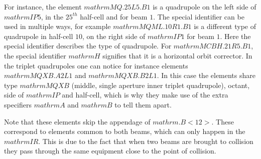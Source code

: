 For instance, the element \(mathrm{MQ.25L5.B1}\) is a quadrupole on the left side of \(mathrm{IP5}\), in the \(25^{th}\) half-cell and for beam \(1\).
The special identifier can be used in multiple ways, for example \(mathrm{MQML.10R1.B1}\) is a different type of quadrupole in half-cell \(10\), on the right side of \(mathrm{IP1}\) for beam \(1\).
Here the special identifier describes the type of quadrupole.
For \(mathrm{MCBH.21R5.B1}\), the special identifier \(mathrm{H}\) signifies that it is a horizontal orbit corrector.
In the triplet quadrupoles one can notice for instance elements \(mathrm{MQXB.A2L1}\) and \(mathrm{MQXB.B2L1}\).
In this case the elements share type \(mathrm{MQXB}\) (middle, single aperture inner triplet quadrupole), octant, side of \(mathrm{IP}\) and half-cell, which is why they make use of the extra specifiers \(mathrm{A}\) and \(mathrm{B}\) to tell them apart.

Note that these elements skip the appendage of \(mathrm{.B<12>}\).
These correspond to elements common to both beams, which can only happen in the \(mathrm{IR}\).
This is due to the fact that when two beams are brought to collision they pass through the same equipment close to the point of collision.

